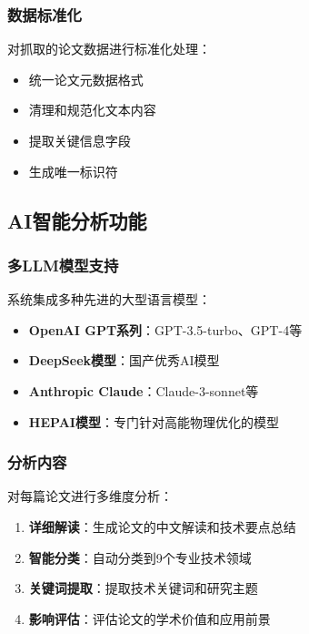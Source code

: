 \documentclass[12pt,a4paper]{article}
\begin{document}
\subsubsection{数据标准化}
对抓取的论文数据进行标准化处理：
\begin{itemize}
    \item 统一论文元数据格式
    \item 清理和规范化文本内容
    \item 提取关键信息字段
    \item 生成唯一标识符
\end{itemize}

\subsection{AI智能分析功能}

\subsubsection{多LLM模型支持}
系统集成多种先进的大型语言模型：
\begin{itemize}
    \item \textbf{OpenAI GPT系列}：GPT-3.5-turbo、GPT-4等
    \item \textbf{DeepSeek模型}：国产优秀AI模型
    \item \textbf{Anthropic Claude}：Claude-3-sonnet等
    \item \textbf{HEPAI模型}：专门针对高能物理优化的模型
\end{itemize}

\subsubsection{分析内容}
对每篇论文进行多维度分析：
\begin{enumerate}
    \item \textbf{详细解读}：生成论文的中文解读和技术要点总结
    \item \textbf{智能分类}：自动分类到9个专业技术领域
    \item \textbf{关键词提取}：提取技术关键词和研究主题
    \item \textbf{影响评估}：评估论文的学术价值和应用前景
\end{enumerate}
\end{document}
